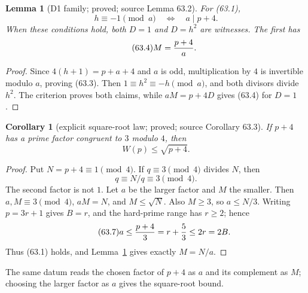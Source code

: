 \documentclass[10pt,reqno]{amsart}
\newtheorem{lemma}[theorem]{Lemma}
\newtheorem{corollary}[theorem]{Corollary}
\theoremstyle{definition}
\newcommand{\1}{\mathbf 1}
\begin{document}
\begin{lemma}[D1 family; proved; source Lemma 63.2]\label{lem:D1-family}
For (63.1),
\begin{equation}\tag{63.3}
 h\equiv-1\pmod a\quad\Longleftrightarrow\quad a\mid p+4.
\end{equation}
When these conditions hold, both $D=1$ and $D=h^2$ are witnesses.  The
first has
\begin{equation}\tag{63.4}
                         M={p+4\over a}.
\end{equation}
\end{lemma}
\begin{proof}
Since $4(h+1)=p+a+4$ and $a$ is odd, multiplication by $4$ is invertible
modulo $a$, proving (63.3).  Then
$1\equiv h^2\equiv-h\pmod a$, and both divisors divide $h^2$.
The criterion proves both claims, while $aM=p+4D$ gives (63.4) for
$D=1$.
\end{proof}

\begin{corollary}[explicit square-root law; proved; source Corollary 63.3]
\label{cor:square-root-law}
If $p+4$ has a prime factor congruent to $3$ modulo $4$, then
\begin{equation}\tag{63.5}
                              W(p)\leq\sqrt{p+4}.
\end{equation}
\end{corollary}
\begin{proof}
Put $N=p+4\equiv1\pmod4$.  If $q\equiv3\pmod4$ divides $N$, then
\begin{equation}\tag{63.6}
                         q\equiv N/q\equiv3\pmod4.
\end{equation}
The second factor is not $1$.  Let $a$ be the larger factor and $M$ the
smaller.  Then $a,M\equiv3\pmod4$, $aM=N$, and $M\leq\sqrt N$.  Also
$M\geq3$, so $a\leq N/3$.  Writing $p=3r+1$ gives $B=r$, and the hard-prime
range has $r\geq2$; hence
\begin{equation}\tag{63.7}
                a\leq{p+4\over3}=r+{5\over3}\leq2r=2B.
\end{equation}
Thus (63.1) holds, and Lemma~\ref{lem:D1-family} gives exactly
$M=N/a$.
\end{proof}
The same datum reads the chosen factor of $p+4$ as $a$ and its complement
as $M$; choosing the larger factor as $a$ gives the square-root bound.
\end{document}
